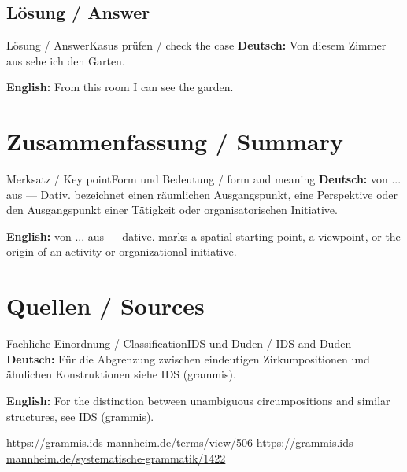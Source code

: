 \documentclass[a4paper,11pt]{article}
\newcommand{\GermanText}[1]{\textbf{Deutsch: }#1\par}
\newcommand{\EnglishText}[1]{{\small\color{SoftGray}\textbf{English: }#1\par}}
\begin{document}
\subsection{Lösung / Answer}
\begin{grammarentry}{Lösung / Answer}{Kasus prüfen / check the case}
\GermanText{Von diesem Zimmer aus sehe ich den Garten.}
\EnglishText{From this room I can see the garden.}
\end{grammarentry}
\section{Zusammenfassung / Summary}
\begin{grammarentry}{Merksatz / Key point}{Form und Bedeutung / form and meaning}
\GermanText{von ... aus — Dativ. bezeichnet einen räumlichen Ausgangspunkt, eine Perspektive oder den Ausgangspunkt einer Tätigkeit oder organisatorischen Initiative.}
\EnglishText{von ... aus — dative. marks a spatial starting point, a viewpoint, or the origin of an activity or organizational initiative.}
\end{grammarentry}
\section{Quellen / Sources}
\begin{grammarentry}{Fachliche Einordnung / Classification}{IDS und Duden / IDS and Duden}
\GermanText{Für die Abgrenzung zwischen eindeutigen Zirkumpositionen und ähnlichen Konstruktionen siehe IDS (grammis).}
\EnglishText{For the distinction between unambiguous circumpositions and similar structures, see IDS (grammis).}
\url{https://grammis.ids-mannheim.de/terms/view/506}
\url{https://grammis.ids-mannheim.de/systematische-grammatik/1422}
\end{grammarentry}
\end{document}
